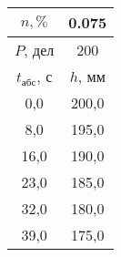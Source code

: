 \begin{tabular}[t]{|c|c|}
\hline
$n, \%$ & 0.075 \\
\hline
$P$, дел & 200 \\
\hline
$t_{абс}$, с & $h$, мм \\ 
\hline
0,0 & 200,0 \\ 
8,0 & 195,0 \\ 
16,0 & 190,0 \\ 
23,0 & 185,0 \\ 
32,0 & 180,0 \\ 
39,0 & 175,0 \\ 
\hline
\end{tabular}